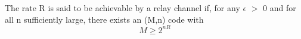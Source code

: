\documentclass[preview]{standalone}
\begin{document}
\begin{center}
The rate R is said to be achievable by a relay channel if, for any $\epsilon$ $>$ 0 and for all n sufficiently large, there exists an (M,n) code with \[M\ge2^{nR}\]
\end{center}
\end{document}
